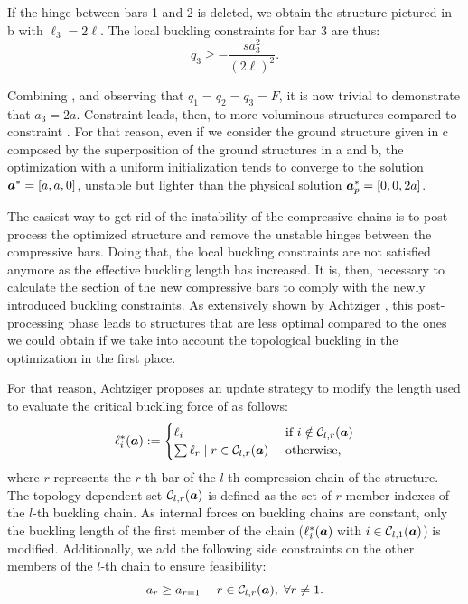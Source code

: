 If the hinge between bars 1 and 2 is deleted, we obtain the structure pictured in b with $\ell_3=2\ell$. The local buckling constraints for bar 3 are thus:
\begin{equation}
    q_3\geq -\frac{s a_3^2}{(2\ell)^2}.
    \label{eq:04_chain_2}
\end{equation}

Combining ,  and observing that $q_1=q_2=q_3=F$, it is now trivial to demonstrate that $a_3=2a$. Constraint  leads, then, to more voluminous structures compared to constraint . For that reason, even if we consider the ground structure given in c composed by the superposition of the ground structures in a and b, the optimization with a uniform initialization tends to converge to the solution $\bm{a}^*=[a,a,0]$, unstable but lighter than the physical solution $\bm{a}_p^*=[0,0,2a]$. 

The easiest way to get rid of the instability of the compressive chains is to post-process the optimized structure and remove the unstable hinges between the compressive bars. Doing that, the local buckling constraints are not satisfied anymore as the effective buckling length has increased. It is, then, necessary to calculate the section of the new compressive bars to comply with the newly introduced buckling constraints. As extensively shown by Achtziger , this post-processing phase leads to structures that are less optimal compared to the ones we could obtain if we take into account the topological buckling in the optimization in the first place.

For that reason, Achtziger proposes an update strategy to modify the length used to evaluate the critical buckling force of  as follows:
\begin{equation}
    \ell^*_i(\bm{a}):= 
    \begin{cases}
        \ell_i & \text { if } i \notin \mathcal{C}_{l,r}(\bm{a}) \\
        \sum \ell_{r} \;|\; r \in \mathcal{C}_{l,r}(\bm{a})  & \text { otherwise,}
    \end{cases}
    \label{eq:04_chain_len}
\end{equation}
where $r$ represents the $r$-th bar of the $l$-th compression chain of the structure. The topology-dependent set $\mathcal{C}_{l,r}(\bm{a})$ is defined as the set of $r$ member indexes of the $l$-th buckling chain. As internal forces on buckling chains are constant, only the buckling length of the first member of the chain ($\ell^*_i(\bm{a}) \text{ with } i \in \mathcal{C}_{l,1}(\bm{a})$) is modified. Additionally, we add the following side constraints on the other members of the $l$-th chain to ensure feasibility:
\begin{equation}
    a_{r}\geq a_{r=1} \quad \; r \in \mathcal{C}_{l,r}(\bm{a}), \; \forall r \neq 1.
    \label{eq:04_side_cons_chain}
\end{equation}

